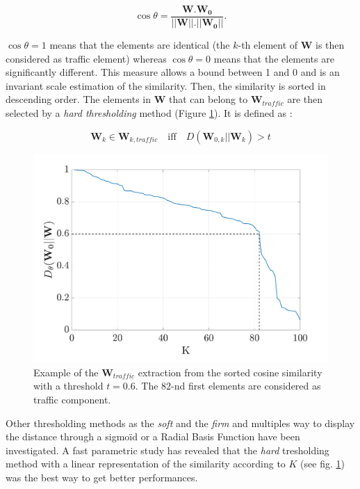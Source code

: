 \documentclass[twocolumn,a4paper,10pt]{article}
\begin{document}
\begin{equation}
\cos \theta = \frac{\mathbf{W}.\mathbf{W_0}}{\vert \vert \mathbf{W}  \vert \vert . \vert \vert \mathbf{W_0} \vert \vert}.
\end{equation}

$\cos \theta = 1$ means that the elements are identical (the $k$-th element of $\mathbf{W}$ is then considered as traffic element) whereas $\cos \theta = 0$ means that the elements are significantly different. This measure allows a bound between 1 and 0 and is an invariant scale estimation of the similarity. Then, the similarity is sorted in descending order. The elements in $\mathbf{W}$ that can belong to $\mathbf{W}_{traffic}$ are then selected by a \textit{hard thresholding} method (Figure \ref{fig:W_ThC_NMF}). It is defined as :

\begin{equation}
\mathbf{W}_k \in \mathbf{W}_{k,traffic} \quad \text{iff} \quad D\left(\mathbf{W}_{0,k} \vert \vert \mathbf{W}_{k} \right) > t
\end{equation}

\begin{figure}[hbtp]
\centering
\includegraphics[width=0.8\linewidth]{../image/distanceCosLinDisplay.pdf}
\caption{Example of the $\mathbf{W}_{traffic}$ extraction from the sorted cosine similarity with a threshold $t = 0.6$. The $82$-nd first elements are considered as traffic component.}
\label{fig:W_ThC_NMF}
\end{figure}

Other thresholding methods as the \textit{soft} \cite{donoho1995noising}and the \textit{firm} \cite{fornasier2008iterative} and multiples way to display the distance through a sigmoïd or a Radial Basis Function have been investigated. A fast parametric study has revealed that the \textit{hard} tresholding method  with a linear representation of the similarity according to $K$ (see fig. \ref{fig:W_ThC_NMF}) was the best way to get better performances. 
\end{document}
